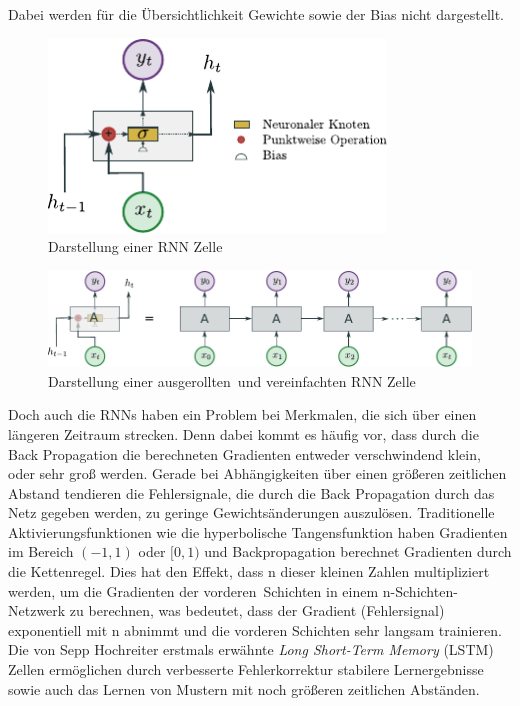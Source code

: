             Dabei werden für die Übersichtlichkeit Gewichte sowie der Bias nicht dargestellt.
                \begin{figure}[ht]
                    \centering
                    \includegraphics[width=0.8\textwidth]{images/Illustrationen/RNN_simple.pdf}
                    \caption{Darstellung einer RNN Zelle}
                    \label{fig:RNN}
                \end{figure}
                \begin{figure}[ht]
                    \centering
                    \includegraphics[width=1\textwidth]{images/Illustrationen/RNN_enrolled}
                    \caption{Darstellung einer \glqq ausgerollten\grqq \ und vereinfachten RNN Zelle}
                    \label{fig:RNN_enroled}
                \end{figure}
            Doch auch die RNNs haben ein Problem bei Merkmalen, die sich über einen längeren Zeitraum strecken.
            Denn dabei kommt es häufig vor, dass durch die Back Propagation die berechneten Gradienten entweder verschwindend klein, oder sehr groß werden.
            Gerade bei Abhängigkeiten über einen größeren zeitlichen Abstand tendieren die Fehlersignale,
            die durch die Back Propagation durch das Netz gegeben werden, zu geringe Gewichtsänderungen auszulösen.
            Traditionelle Aktivierungsfunktionen wie die hyperbolische Tangensfunktion haben Gradienten im Bereich $(-1,1)$ oder $[0,1)$ und Backpropagation berechnet Gradienten durch die Kettenregel.
            Dies hat den Effekt, dass n dieser kleinen Zahlen multipliziert werden, um die Gradienten der \glqq vorderen\grqq \ Schichten in einem n-Schichten-Netzwerk zu berechnen, was bedeutet, dass der Gradient (Fehlersignal) exponentiell mit n abnimmt und die vorderen Schichten sehr langsam trainieren.
            Die von Sepp Hochreiter erstmals erwähnte \textit{Long Short-Term Memory} (LSTM) Zellen ermöglichen durch verbesserte Fehlerkorrektur stabilere Lernergebnisse sowie auch das Lernen von Mustern mit noch größeren zeitlichen Abständen.~\cite{HOCHREITER1998}

